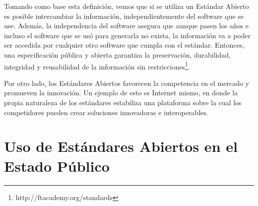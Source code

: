 \documentclass[12pt]{article}
\begin{document}
Tomando como base esta definición, vemos que si se utiliza un Estándar Abierto es posible intercambiar la información, independientemente del software que se use. Además, la independencia del software asegura que aunque pasen los años e incluso el software que se usó para generarla no exista, la información va a poder ser accedida por cualquier otro software que cumpla con el estándar. Entonces, una especificación pública y abierta garantiza la preservación, durabilidad, integridad y reusabilidad de la información sin restricciones\footnote{http://ftacademy.org/standards}. 

Por otro lado, los Estándares Abiertos favorecen la competencia en el mercado y promueven la innovación. Un ejemplo de esto es Internet mismo, en donde la propia naturaleza de los estándares estabiliza una plataforma sobre la cual los competidores pueden crear soluciones innovadoras e interoperables. 
 
\section*{Uso de Estándares Abiertos en el Estado Público}
\end{document}
